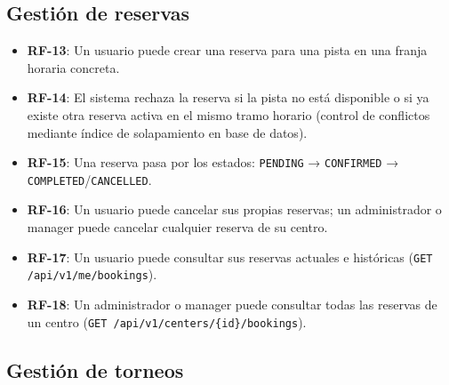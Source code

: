 \subsection{Gestión de reservas}

\begin{itemize}
  \item \textbf{RF-13}: Un usuario puede crear una reserva para una pista en
    una franja horaria concreta.
  \item \textbf{RF-14}: El sistema rechaza la reserva si la pista no está
    disponible o si ya existe otra reserva activa en el mismo tramo horario
    (control de conflictos mediante índice de solapamiento en base de datos).
  \item \textbf{RF-15}: Una reserva pasa por los estados:
    \texttt{PENDING} → \texttt{CONFIRMED} → \texttt{COMPLETED}/\texttt{CANCELLED}.
  \item \textbf{RF-16}: Un usuario puede cancelar sus propias reservas; un
    administrador o manager puede cancelar cualquier reserva de su centro.
  \item \textbf{RF-17}: Un usuario puede consultar sus reservas actuales e
    históricas (\texttt{GET /api/v1/me/bookings}).
  \item \textbf{RF-18}: Un administrador o manager puede consultar todas las
    reservas de un centro (\texttt{GET /api/v1/centers/\{id\}/bookings}).
\end{itemize}

\subsection{Gestión de torneos}

